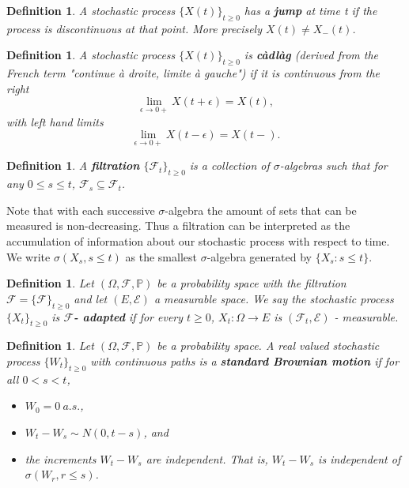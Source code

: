 \documentclass[honours,12pt]{UNSWthesis}
\newcommand{\PP}{\mathbb{P}}
\newcommand{\1}{\mathbf 1}
\newcommand{\FF}{\mathcal{F}}
\newtheorem{definition}[theorem]{Definition}
\numberwithin{equation}{section}
\theoremstyle{definition}
\theoremstyle{remark}
\begin{document}
\begin{definition}
A stochastic process $\{X(t)\}_{t\geq 0}$ has a \textbf{jump} at time t if the process is discontinuous at that point. More precisely $X(t) \neq X_-(t)$.\\
\end{definition}

\begin{definition}
A stochastic process $\{X(t)\}_{t\geq 0}$ is \textbf{c\`{a}dl\`{a}g} (derived from the French term "continue \`{a} droite, limite \`{a} gauche") if it is continuous from the right
\[
	\lim_{\epsilon\to0+}X(t+\epsilon)=X(t),
\]
with left hand limits
\[
	\lim_{\epsilon\to0+}X(t-\epsilon)=X(t-).
\]
\end{definition}

\begin{definition}
A \textbf{filtration} $\{\FF_t\}_{t\geq 0}$ is a collection of $\sigma$-algebras such that for any $0\leq s \leq t$, $\FF_s \subseteq \FF_t$.\\
\end{definition}

{\noindent}Note that with each successive $\sigma$-algebra the amount of sets that can be measured is non-decreasing. Thus a filtration can be interpreted as the accumulation of information about our stochastic process with respect to time. We write $\sigma(X_s,s\leq t)$ as the smallest $\sigma$-algebra generated by $\{X_s: s\leq t\}$.\\

\begin{definition}
Let $(\Omega,\FF,\PP)$ be a probability space with the filtration $\FF = \{\FF\}_{t\geq 0}$ and let $(E,\mathcal{E})$ a measurable space. We say the stochastic process $\{X_t\}_{t\geq 0}$ is $\boldsymbol{\FF}$\textbf{- adapted} if for every $t\geq 0$, $X_t: \Omega \rightarrow E$ is $(\FF_t, \mathcal{E})$ - measurable.\\
\end{definition}

\begin{definition}
Let $(\Omega, \FF,\PP)$ be a probability space. A real valued stochastic process $\{W_t\}_{t\geq 0}$ with continuous paths is a \textbf{standard Brownian motion} if for all $0<s<t$,
\begin{itemize}
\item $W_0 = 0\ a.s.$,
\item $W_t - W_s \sim N(0,t-s)$, and
\item the increments $W_t - W_s$ are independent. That is, $W_t - W_s$ is independent of $\sigma(W_r,r\leq s)$.\\
\end{itemize}
\end{definition}
\end{document}

